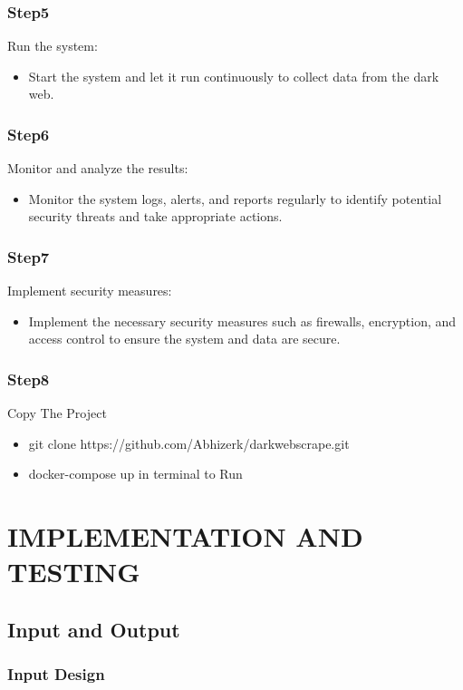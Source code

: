 \documentclass[10pt]{report}
\begin{document}
\subsection{Step5}
Run the system: 
\begin{itemize}
    \item Start the system and let it run continuously to collect data from the dark web.
\end{itemize}

\subsection{Step6}
Monitor and analyze the results: 
\begin{itemize}
    \item Monitor the system logs, alerts, and reports regularly to identify potential security threats and take appropriate actions.
\end{itemize}

\subsection{Step7}
Implement security measures: 
\begin{itemize}
    \item Implement the necessary security measures such as firewalls, encryption, and access control to ensure the system and data are secure.
\end{itemize}

\subsection{Step8}
Copy The Project 
\begin{itemize}
    \item git clone https://github.com/Abhizerk/darkwebscrape.git
    \item docker-compose up in terminal to Run 
\end{itemize}




\chapter{IMPLEMENTATION AND TESTING}
\linespread{1.5}
\section{Input and Output}
\subsection{Input Design}
\end{document}
